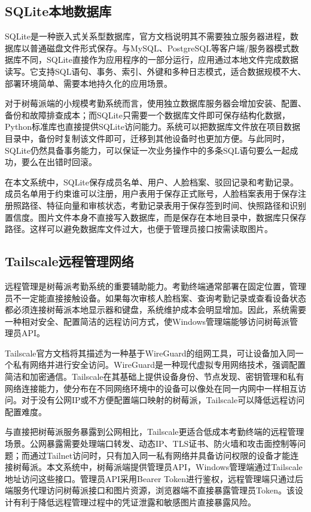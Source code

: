 \subsection{SQLite本地数据库}

SQLite是一种嵌入式关系型数据库，官方文档说明其不需要独立服务器进程，数据库以普通磁盘文件形式保存\cite{sqlite}。与MySQL、PostgreSQL等客户端/服务器模式数据库不同，SQLite直接作为应用程序的一部分运行，应用通过本地文件完成数据读写。它支持SQL语句、事务、索引、外键和多种日志模式，适合数据规模不大、部署环境简单、需要本地持久化的应用场景。

对于树莓派端的小规模考勤系统而言，使用独立数据库服务器会增加安装、配置、备份和故障排查成本；而SQLite只需要一个数据库文件即可保存结构化数据，Python标准库也直接提供SQLite访问能力。系统可以把数据库文件放在项目数据目录中，备份时复制该文件即可，迁移到其他设备时也更加方便。与此同时，SQLite仍然具备事务能力，可以保证一次业务操作中的多条SQL语句要么一起成功，要么在出错时回滚。

在本文系统中，SQLite保存成员名单、用户、人脸档案、驳回记录和考勤记录。成员名单用于约束谁可以注册，用户表用于保存正式账号，人脸档案表用于保存注册照路径、特征向量和审核状态，考勤记录表用于保存签到时间、快照路径和识别置信度。图片文件本身不直接写入数据库，而是保存在本地目录中，数据库只保存路径。这样可以避免数据库文件过大，也便于管理员接口按需读取图片。

\subsection{Tailscale远程管理网络}

远程管理是树莓派考勤系统的重要辅助能力。考勤终端通常部署在固定位置，管理员不一定能直接接触设备。如果每次审核人脸档案、查询考勤记录或查看设备状态都必须连接树莓派本地显示器和键盘，系统维护成本会明显增加。因此，系统需要一种相对安全、配置简洁的远程访问方式，使Windows管理端能够访问树莓派管理员API。

Tailscale官方文档将其描述为一种基于WireGuard的组网工具，可让设备加入同一个私有网络并进行安全访问\cite{tailscale}。WireGuard是一种现代虚拟专用网络技术，强调配置简洁和加密通信。Tailscale在其基础上提供设备身份、节点发现、密钥管理和私有网络连接能力，使分布在不同网络环境中的设备可以像处在同一内网中一样相互访问。对于没有公网IP或不方便配置端口映射的树莓派，Tailscale可以降低远程访问配置难度。

与直接把树莓派服务暴露到公网相比，Tailscale更适合低成本考勤终端的远程管理场景。公网暴露需要处理端口转发、动态IP、TLS证书、防火墙和攻击面控制等问题；而通过Tailnet访问时，只有加入同一私有网络并具备访问权限的设备才能连接树莓派。本文系统中，树莓派端提供管理员API，Windows管理端通过Tailscale地址访问这些接口。管理员API采用Bearer Token进行鉴权，远程管理端只通过后端服务代理访问树莓派接口和图片资源，浏览器端不直接暴露管理员Token。该设计有利于降低远程管理过程中的凭证泄露和敏感图片直接暴露风险。
